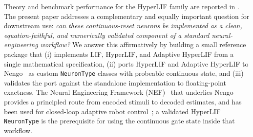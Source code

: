 \documentclass[11pt]{article}
\newcommand{\code}[1]{\texttt{#1}}
\begin{document}
Theory and benchmark performance for the HyperLIF family are reported in
\cite{hyperlif_theory}. The present paper addresses a complementary and equally
important question for downstream use: \emph{can these continuous-reset neurons
be implemented as a clean, equation-faithful, and numerically validated
component of a standard neural-engineering workflow?} We answer this
affirmatively by building a small reference package that (i) implements LIF,
HyperLIF, and Adaptive HyperLIF from a single mathematical specification, (ii)
ports HyperLIF and Adaptive HyperLIF to Nengo~\cite{bekolay2014nengo} as custom
\code{NeuronType} classes with probeable continuous state, and (iii) validates
the port against the standalone implementation to floating-point exactness. The
Neural Engineering Framework (NEF)~\cite{eliasmith2003neural} that underlies
Nengo provides a principled route from encoded stimuli to decoded estimates, and
has been used for closed-loop adaptive robot control~\cite{dewolf2016reach}; a
validated HyperLIF \code{NeuronType} is the prerequisite for using the
continuous gate state inside that workflow.
\end{document}
